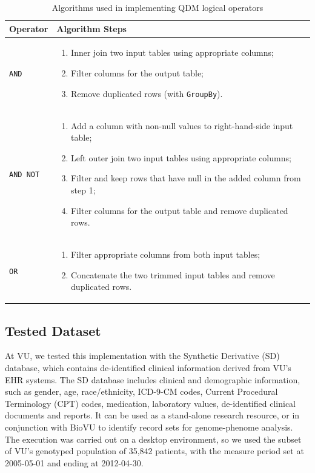 \documentclass{article}
\begin{document}
\vspace{5pt}
\begin{table}[h]
\begin{center}
\begin{tabular}{p{}p{}}
\toprule
Operator	&Algorithm Steps \\
\midrule
\texttt{AND}	&\begin{enumerate} 
  \item Inner join two input tables using appropriate columns;
  \item Filter columns for the output table;
  \item Remove duplicated rows (with \texttt{GroupBy}).
\end{enumerate}
\\ 
\texttt{AND NOT}	&\begin{enumerate} 
  \item Add a column with non-null values to right-hand-side input table;
  \item Left outer join two input tables using appropriate columns;
  \item Filter and keep rows that have null in the added column from step 1;
  \item Filter columns for the output table and remove duplicated rows.
\end{enumerate}
\\ 
\texttt{OR}	&\begin{enumerate} 
  \item Filter appropriate columns from both input tables;
  \item Concatenate the two trimmed input tables and remove duplicated rows.
\end{enumerate}
\\ 
\bottomrule
\end{tabular}
\caption{Algorithms used in implementing QDM logical operators} 
\label{tab:boolean}
\end{center}
\end{table}

\subsection{Tested Dataset}

At VU, we tested this implementation with the Synthetic Derivative (SD) database\cite{roden_development_2008}, which contains de-identified clinical information derived from VU's EHR systems. The SD database includes clinical and demographic information, such as gender, age, race/ethnicity, ICD-9-CM codes, Current Procedural Terminology (CPT) codes, medication, laboratory values, de-identified clinical documents and reports. It can be used as a stand-alone research resource, or in conjunction with BioVU to identify record sets for genome-phenome analysis. The execution was carried out on a desktop environment, so we used the subset of VU's genotyped population of 35,842 patients, with the measure period set at 2005-05-01 and ending at 2012-04-30.
\end{document}
